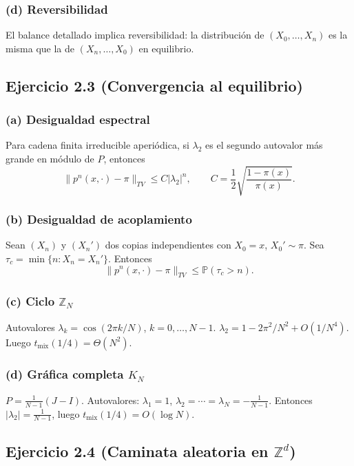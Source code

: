 \documentclass[letterpaper, 12pt]{article}
\renewcommand{\P}{\mathbb{P}}
\newcommand{\Z}{\mathbb{Z}}
\newcommand{\1}{\mathbbm{1}}
\begin{document}
    \subsubsection*{(d) Reversibilidad}
    El balance detallado implica reversibilidad: la distribuci\'on de $(X_0,\dots,X_n)$ es la misma que la de $(X_n,\dots,X_0)$ en equilibrio.

    \subsection{Ejercicio 2.3 (Convergencia al equilibrio)}

    \subsubsection*{(a) Desigualdad espectral}
    Para cadena finita irreducible aperi\'odica, si $\lambda_2$ es el segundo autovalor m\'as grande en m\'odulo de $P$, entonces
    \[
    \|p^n(x,\cdot)-\pi\|_{TV}\le C|\lambda_2|^n,\qquad C=\frac12\sqrt{\frac{1-\pi(x)}{\pi(x)}}.
    \]

    \subsubsection*{(b) Desigualdad de acoplamiento}
    Sean $(X_n)$ y $(X_n')$ dos copias independientes con $X_0=x$, $X_0'\sim\pi$. Sea $\tau_c=\min\{n:X_n=X_n'\}$. Entonces
    \[
    \|p^n(x,\cdot)-\pi\|_{TV}\le\P(\tau_c>n).
    \]

    \subsubsection*{(c) Ciclo $\Z_N$}
    Autovalores $\lambda_k=\cos(2\pi k/N)$, $k=0,\dots,N-1$. $\lambda_2=1-2\pi^2/N^2+O(1/N^4)$. Luego $t_{\text{mix}}(1/4)=\Theta(N^2)$.

    \subsubsection*{(d) Gr\'afica completa $K_N$}
    $P=\frac1{N-1}(J-I)$. Autovalores: $\lambda_1=1$, $\lambda_2=\cdots=\lambda_N=-\frac1{N-1}$. Entonces $|\lambda_2|=\frac1{N-1}$, luego $t_{\text{mix}}(1/4)=O(\log N)$.

    \subsection{Ejercicio 2.4 (Caminata aleatoria en $\Z^d$)}
\end{document}
